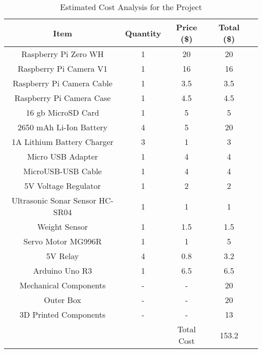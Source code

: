 \begin{center}
\begin{table} [h!]
\centering
\begin{tabular}{ |c|c|c|c|c| } 
\hline
Item & Quantity & Price (\$) & Total (\$) \\
\hline
Raspberry Pi Zero WH & 1 & 20 & 20 \\
\hline
Raspberry Pi Camera V1 & 1 & 16 & 16 \\
\hline
Raspberry Pi Camera Cable & 1 & 3.5 & 3.5 \\
\hline
Raspberry Pi Camera Case & 1 & 4.5 & 4.5 \\
\hline
16 gb MicroSD Card  & 1 & 5 & 5 \\
\hline
2650 mAh Li-Ion Battery & 4 & 5 & 20 \\ 
\hline
1A Lithium Battery Charger & 3 & 1 & 3 \\ 
\hline
Micro USB Adapter & 1 & 4 & 4 \\ 
\hline
MicroUSB-USB Cable & 1 & 4 & 4 \\ 
\hline
5V Voltage Regulator & 1 & 2 & 2 \\ 
\hline
Ultrasonic Sonar Sensor HC-SR04 & 1 & 1 & 1 \\ 
\hline
Weight Sensor & 1 & 1.5 & 1.5 \\ 
\hline
Servo Motor MG996R & 1 & 1 & 5 \\ 
\hline
5V Relay & 4 & 0.8 & 3.2 \\ 
\hline
Arduino Uno R3 & 1 & 6.5 & 6.5 \\ 
\hline
Mechanical Components & - & - & 20 \\
\hline
Outer Box & - & - & 20 \\
\hline
3D Printed Components & - & - & 13 \\ 
\hline
 & & Total Cost & 153.2 \\ 
\hline
\end{tabular}
\caption{Estimated Cost Analysis for the Project}
\label{table:costanalysis}
\end{table}
\end{center}